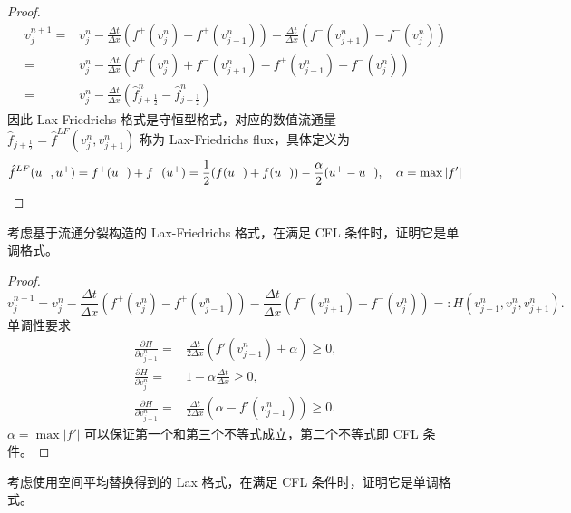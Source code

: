 \begin{proof}
    {\small
        \begin{align*}
            v_j^{n+1} ={} & v_j^n - \frac{\Delta t}{\Delta x}(f^+(v_{j}^n)-f^+(v_{j-1}^n))
            - \frac{\Delta t}{\Delta x}(f^-(v_{j+1}^n)-f^-(v_{j}^n))                       \\
            ={}           & v_j^n - \frac{\Delta t}{\Delta x}\left(
            f^+(v_{j}^n) + f^-(v_{j+1}^n) - f^+(v_{j-1}^n) - f^-(v_{j}^n)
            \right)                                                                        \\
            ={}           & v_j^n - \frac{\Delta t}{\Delta x}\left(
            \hat{f}_{j+\frac12}^n - \hat{f}_{j-\frac12}^n
            \right)
        \end{align*}}
    因此 Lax-Friedrichs 格式是守恒型格式，对应的数值流通量 $\hat{f}_{j+\frac12} = \hat{f}^{LF}(v_j^n,v_{j+1}^n)$ 称为 Lax-Friedrichs flux，具体定义为
    \[
        \hat{f}^{LF}(u^-,u^+) =
        f^+(u^-) + f^-(u^+) =
        \frac12(f(u^-)+f(u^+)) - \frac{\alpha}2 (u^+-u^-),\quad \alpha = \max |f'| \qedhere
    \]
\end{proof}


\begin{example}
    考虑基于流通分裂构造的 Lax-Friedrichs 格式，在满足 CFL 条件时，证明它是单调格式。
\end{example}

\begin{proof}
    \[
        v_j^{n+1} ={}  v_j^n - \frac{\Delta t}{\Delta x}(f^+(v_{j}^n)-f^+(v_{j-1}^n))
        - \frac{\Delta t}{\Delta x}(f^-(v_{j+1}^n)-f^-(v_{j}^n))   =:   H(v_{j-1}^n,v_j^n,v_{j+1}^n).
    \]
    单调性要求
    \begin{align*}
        \frac{\partial H}{\partial v^n_{j-1}} ={} & \frac{\Delta t}{2\Delta x}(f'(v^n_{j-1})+\alpha)\ge 0 , \\
        \frac{\partial H}{\partial v^n_{j}} ={}   & 1-\alpha\frac{\Delta t}{\Delta x}\ge 0,                 \\
        \frac{\partial H}{\partial v^n_{j+1}} ={} & \frac{\Delta t}{2\Delta x}(\alpha-f'(v^n_{j+1}))\ge  0.
    \end{align*}
    $\alpha = \max |f'|$ 可以保证第一个和第三个不等式成立，第二个不等式即 CFL 条件。
\end{proof}

\begin{example}
    考虑使用空间平均替换得到的 Lax 格式，在满足 CFL 条件时，证明它是单调格式。
\end{example}

